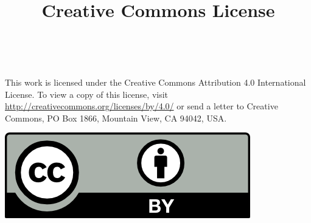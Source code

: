\begin{center}
\space
\end{center}


\begin{flushleft}
\title{\Large\textbf{Creative Commons License}}\\
\end{flushleft}

{
\large This work is licensed under the Creative Commons Attribution 4.0 International License. To view a copy of this license, visit \url{http://creativecommons.org/licenses/by/4.0/} or send a letter to Creative Commons, PO Box 1866, Mountain View, CA 94042, USA.
}

\begin{center}

\includegraphics{by.png}

\end{center}